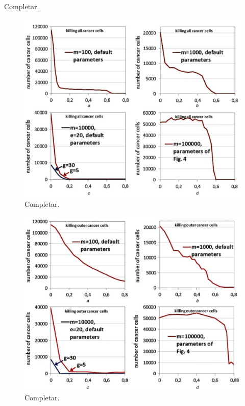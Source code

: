 Completar.

\begin{figure}[h]
\centering
\includegraphics[scale=0.7]{figures/experiments/exp7}
\caption{Completar.}
\end{figure}

\begin{figure}[h]
\centering
\includegraphics[scale=0.7]{figures/experiments/exp8}
\caption{Completar.}
\end{figure}
